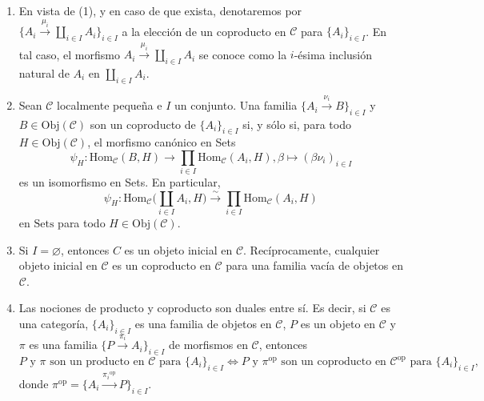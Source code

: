 \documentclass[tesis]{subfiles}
\begin{document}
\begin{Obs}
\begin{enumerate}[label=(\arabic*)]
        \item En vista de (1), y en caso de que exista, denotaremos por $\{A_i\xrightarrow[]{\mu_i} \coprod_{i\in I}A_i\}_{i\in I}$ a la elección de un coproducto en $\mathscr{C}$ para $\{A_i\}_{i\in I}$. En tal caso, el morfismo $A_i\xrightarrow[]{\mu_i} \coprod_{i\in I}A_i$ se conoce como la $i$-ésima inclusión natural de $A_i$ en $\coprod_{i\in I}A_i$.
            
        \item Sean $\mathscr{C}$ localmente pequeña e $I$ un conjunto. Una familia $\{A_i\xrightarrow[]{\nu_i} B\}_{i\in I}$ y $B\in\text{Obj}(\mathscr{C})$ son un coproducto de $\{A_i\}_{i\in I}$ si, y sólo si, para todo $H\in\text{Obj}(\mathscr{C})$, el morfismo canónico en Sets
            \[
                \psi_H:\text{Hom}_\mathscr{C}(B,H)\to \prod_{i\in I}\text{Hom}_\mathscr{C}(A_i,H), \beta\mapsto (\beta\nu_i)_{i\in I}
            \] 
            es un isomorfismo en Sets. En particular, 
            \[
            \psi_H:\text{Hom}_\mathscr{C}\bigg(\coprod_{i\in I}A_i,H\bigg) \xrightarrow[]{\sim} \prod_{i\in I}\text{Hom}_\mathscr{C}(A_i,H)
            \] 
            en $\text{Sets}$ para todo $H\in\text{Obj}(\mathscr{C})$.

        \item Si $I=\varnothing$, entonces $C$ es un objeto inicial en $\mathscr{C}$. Recíprocamente, cualquier objeto inicial en $\mathscr{C}$ es un coproducto en $\mathscr{C}$ para una familia vacía de objetos en $\mathscr{C}$.

        \item Las nociones de producto y coproducto son duales entre sí. Es decir, si $\mathscr{C}$ es una categoría, $\{A_i\}_{i\in I}$ es una familia de objetos en $\mathscr{C}$, $P$ es un objeto en $\mathscr{C}$ y $\pi$ es una familia $\{P\xrightarrow[]{\pi_i}A_i\}_{i\in I}$ de morfismos en $\mathscr{C}$, entonces %
            \[
                P \text{ y } \pi \text{ son un producto en } \mathscr{C} \text{ para } \{A_i\}_{i\in I} \iff P \text{ y } \pi^\text{op} \text{ son un coproducto en } \mathscr{C}^\text{op} \text{ para } \{A_i\}_{i\in I},
            \] 
            donde $\pi^\text{op} = \{A_i\xrightarrow[]{\pi_i{}^\text{op}}P\}_{i\in I}$.
    \end{enumerate}
\end{Obs}
\end{document}
